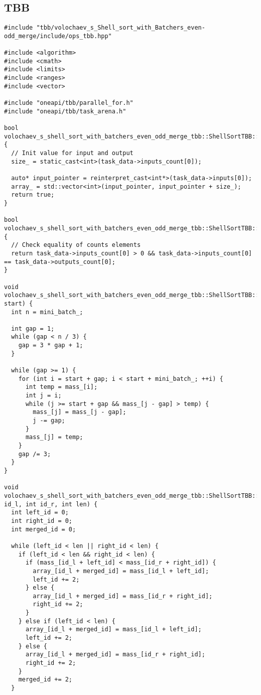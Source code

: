 \documentclass[12pt]{article}
\begin{document}
\subsection*{TBB}
\begin{lstlisting}
#include "tbb/volochaev_s_Shell_sort_with_Batchers_even-odd_merge/include/ops_tbb.hpp"

#include <algorithm>
#include <cmath>
#include <limits>
#include <ranges>
#include <vector>

#include "oneapi/tbb/parallel_for.h"
#include "oneapi/tbb/task_arena.h"

bool volochaev_s_shell_sort_with_batchers_even_odd_merge_tbb::ShellSortTBB::PreProcessingImpl() {
  // Init value for input and output
  size_ = static_cast<int>(task_data->inputs_count[0]);

  auto* input_pointer = reinterpret_cast<int*>(task_data->inputs[0]);
  array_ = std::vector<int>(input_pointer, input_pointer + size_);
  return true;
}

bool volochaev_s_shell_sort_with_batchers_even_odd_merge_tbb::ShellSortTBB::ValidationImpl() {
  // Check equality of counts elements
  return task_data->inputs_count[0] > 0 && task_data->inputs_count[0] == task_data->outputs_count[0];
}

void volochaev_s_shell_sort_with_batchers_even_odd_merge_tbb::ShellSortTBB::ShellSort(int start) {
  int n = mini_batch_;

  int gap = 1;
  while (gap < n / 3) {
    gap = 3 * gap + 1;
  }

  while (gap >= 1) {
    for (int i = start + gap; i < start + mini_batch_; ++i) {
      int temp = mass_[i];
      int j = i;
      while (j >= start + gap && mass_[j - gap] > temp) {
        mass_[j] = mass_[j - gap];
        j -= gap;
      }
      mass_[j] = temp;
    }
    gap /= 3;
  }
}

void volochaev_s_shell_sort_with_batchers_even_odd_merge_tbb::ShellSortTBB::MergeBlocks(int id_l, int id_r, int len) {
  int left_id = 0;
  int right_id = 0;
  int merged_id = 0;

  while (left_id < len || right_id < len) {
    if (left_id < len && right_id < len) {
      if (mass_[id_l + left_id] < mass_[id_r + right_id]) {
        array_[id_l + merged_id] = mass_[id_l + left_id];
        left_id += 2;
      } else {
        array_[id_l + merged_id] = mass_[id_r + right_id];
        right_id += 2;
      }
    } else if (left_id < len) {
      array_[id_l + merged_id] = mass_[id_l + left_id];
      left_id += 2;
    } else {
      array_[id_l + merged_id] = mass_[id_r + right_id];
      right_id += 2;
    }
    merged_id += 2;
  }


\end{lstlisting}
\end{document}
